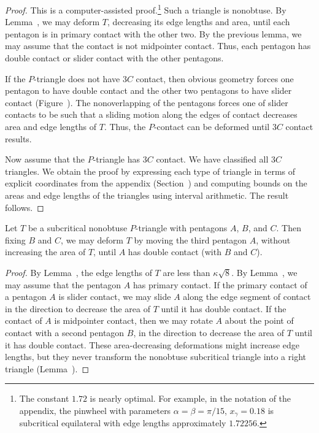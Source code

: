 \begin{proof} This is a computer-assisted proof.\footnote{The constant
    $1.72$ is nearly optimal.  For example, in the notation of the
    appendix, the pinwheel with parameters $\alpha=\beta=\pi/15$,
    $x_\gamma = 0.18$ is subcritical equilateral with edge lengths
    approximately $1.72256$.} Such a triangle is nonobtuse.  By
  Lemma~, we may deform $T$, decreasing its
  edge lengths and area, until each pentagon is in primary contact
  with the other two.  By the previous lemma, we may assume that the
  contact is not midpointer contact.  Thus, each pentagon has double
  contact or slider contact with the other pentagons.

  If the $P$-triangle does not have $3C$ contact, then obvious
  geometry forces one pentagon to have double contact and the other
  two pentagons to have slider contact (Figure~).
  The nonoverlapping of the pentagons forces one of slider contacts to
  be such that a sliding motion along the edges of contact decreases
  area and edge lengths of $T$.  Thus, the $P$-contact can be deformed
  until $3C$ contact results.



Now assume that the $P$-triangle has $3C$ contact.  We have classified
all $3C$ triangles.  We obtain the proof by expressing each type of
triangle in terms of explicit coordinates from the appendix
(Section~) and computing bounds on the areas and
edge lengths of the triangles using interval arithmetic.  The result
follows.
\end{proof}

\begin{lemma} 
  Let $T$ be a subcritical nonobtuse $P$-triangle with pentagons $A$,
  $B$, and $C$.  Then fixing $B$ and $C$, we may deform $T$ by moving
  the third pentagon $A$, without increasing the area of $T$, until
  $A$ has double contact (with $B$ and $C$).
\end{lemma}

\begin{proof}
  By Lemma~, the edge lengths of $T$ are less than
  $\kappa\sqrt8$.  By Lemma~, we may assume that
  the pentagon $A$ has primary contact.  If the primary contact of a
  pentagon $A$ is slider contact, we may slide $A$ along the edge
  segment of contact in the direction to decrease the area of $T$
  until it has double contact.  If the contact of $A$ is midpointer
  contact, then we may rotate $A$ about the point of contact with a
  second pentagon $B$, in the direction to decrease the area of $T$
  until it has double contact.  These area-decreasing deformations
  might increase edge lengths, but they
  never transform the nonobtuse subcritical triangle into a right
  triangle (Lemma~).
\end{proof}


